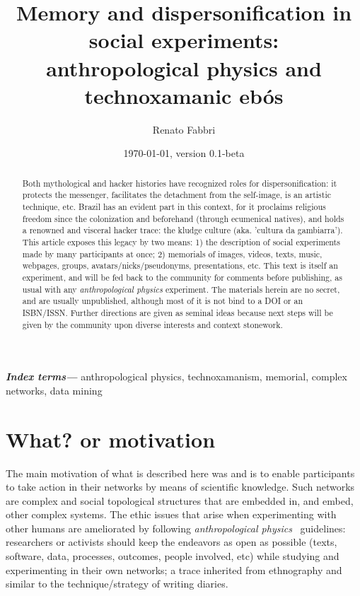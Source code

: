 \documentclass[a4paper]{article}
\title{
Memory and dispersonification in social experiments:\\
anthropological physics and technoxamanic ebós
}
\author{Renato Fabbri}
\date{\today, version 0.1-beta}
\providecommand{\keywords}[1]{\textbf{\textit{Index terms---}} #1}
\begin{document}
\maketitle



\begin{abstract}
Both mythological and hacker histories have recognized roles for
dispersonification: it protects the messenger, facilitates the detachment
from the self-image, is an artistic technique, etc.  Brazil has an evident part
in this context, for it proclaims religious freedom since the colonization and
beforehand (through ecumenical natives), and holds a renowned and visceral hacker trace:
  the kludge culture (aka. 'cultura da gambiarra').  This article exposes this legacy by two
means: 1) the description of social experiments made by many participants at once;
2) memorials of images, videos, texts, music, webpages, groups,
avatars/nicks/pseudonyms, presentations, etc.  This text is itself an
experiment, and will be fed back to the community for comments before
publishing, as usual with any \emph{anthropological physics} experiment.  The
materials herein are no secret, and are usually unpublished, although most
of it is not bind to a DOI or an ISBN/ISSN.  Further directions are given as
seminal ideas because next steps will be given by the community upon diverse
interests and context stonework.
\end{abstract}

\keywords{
anthropological physics, technoxamanism, memorial, complex networks,
data mining
}

\tableofcontents

\section{What? or motivation}
The main motivation of what is described here was and is to enable
participants to take action in their networks by means of scientific
knowledge.  Such networks are complex and social topological
structures that are embedded in, and embed, other complex systems.  The ethic
issues that arise when experimenting with other humans are ameliorated by following
\emph{anthropological physics}~\cite{anPhy,anPhy2,thesis} guidelines:
researchers or activists should keep the endeavors as open as possible (texts,
software, data, processes, outcomes, people involved, etc) while studying and
experimenting in their own networks; a trace inherited from ethnography and
similar to the technique/strategy of writing diaries.
\end{document}

